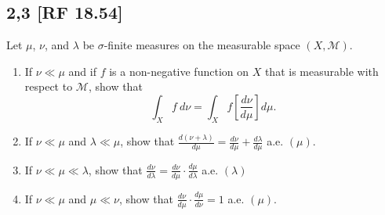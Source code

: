 \documentclass[12pt]{article}
\begin{document}
\subsection*{2,3 [RF 18.54]}
\begin{tcolorbox}
  Let $\mu$, $\nu$, and $\lambda$ be $\sigma$-finite measures on the measurable space $(X, \mathcal{M})$.
  \begin{enumerate}[label = (\roman*)]
    \item If $\nu \ll \mu$ and if $f$ is a non-negative function on $X$ that is measurable with respect to $\mathcal{M}$, show that
      \[ \int_{X} f\ d\nu = \int_{X}f\left[ \frac{d\nu}{d\mu} \right]d\mu. \]
    \item If $\nu \ll \mu$ and $\lambda \ll \mu$, show that $\frac{d(\nu + \lambda)}{d\mu} = \frac{d\nu}{d\mu} + \frac{d\lambda}{d\mu}$ a.e. $(\mu)$.
    \item If $\nu \ll \mu \ll \lambda$, show that $\frac{d\nu}{d\lambda} = \frac{d\nu}{d\mu}\cdot \frac{d\mu}{d\lambda}$  a.e. $(\lambda)$
    \item If $\nu \ll \mu$ and $\mu \ll \nu$, show that $\frac{d\nu}{d\mu}\cdot \frac{d\mu}{d\nu} = 1$ a.e. $(\mu)$.
  \end{enumerate}
\end{tcolorbox}
\end{document}

